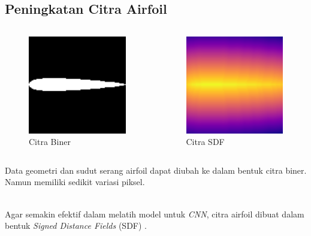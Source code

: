 \subsection{Peningkatan Citra Airfoil}
\begin{frame}
    \begin{columns}[t]%
    \begin{column}{.5\linewidth}
      \begin{figure}[h]
        \centering
        \includegraphics[width=0.5\linewidth]{statics/biner}
        \caption{Citra Biner}
        \label{fig:biner}
      \end{figure}
    \end{column}
    \begin{column}{.5\linewidth}
      \begin{figure}[h]
        \centering
        \includegraphics[width=0.5\linewidth]{statics/sdf}
        \caption{Citra SDF}
        \label{fig:biner}
      \end{figure}
    \end{column}
  \end{columns}

  Data geometri dan sudut serang airfoil dapat diubah ke dalam bentuk citra biner. Namun memiliki sedikit variasi piksel. \\~\\

  \pause

  Agar semakin efektif dalam melatih model untuk \textit{CNN}, citra airfoil dibuat dalam bentuk \textit{Signed Distance Fields} (SDF) \cite{guo2016convolutional}.\\~\\
\end{frame}

